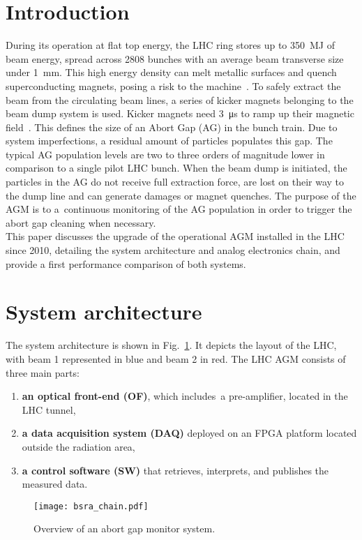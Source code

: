 \section{Introduction}
During its operation at flat top energy, the LHC ring stores up to \SI{350}{MJ} of beam energy, spread across 2808 bunches with an average beam transverse size under \SI{1}{mm}.
%
This high energy density can melt metallic surfaces and quench
superconducting magnets, posing a risk to the machine~\cite{LHC_report}.
%
To safely extract the beam from the circulating beam lines, a series of kicker magnets belonging to the beam dump system is used. 
%
Kicker magnets need \SI{3}{\micro\second} to ramp up their magnetic field~\cite{beam_dump_system}.
%
This defines the size of an Abort Gap (AG) in the bunch train.
%
Due to system imperfections, a residual amount of particles populates this gap.
%
The typical AG population levels are two to three orders of magnitude lower in comparison to a single pilot LHC bunch.
%
When the beam dump is initiated, the particles in the AG do not receive full
extraction force, are lost on their way to the dump line and can generate damages or magnet quenches.  
%
%
The purpose of the AGM \cite{particles_in_ag} is to 
a~continuous monitoring of the AG population in order to trigger the abort gap cleaning when  necessary. 
\\
This paper discusses the upgrade of the operational AGM installed in the LHC since 2010, detailing the system architecture and analog electronics chain, and provide a first performance comparison  of both systems.

\section{System architecture}
The system architecture is shown in Fig.~\ref{fig:bsra_chain}.
%
It depicts the layout of the LHC, with beam 1 represented in blue and beam 2 in red.
%
The LHC AGM consists of three main parts:
%
\begin{enumerate}
    \item \textbf{an optical front-end (OF)}, which includes~a pre-amplifier, located in the LHC tunnel,
    \item \textbf{a data acquisition system (DAQ)} deployed on an FPGA platform located outside the radiation area,
    \item \textbf{a control software (SW)} that retrieves, interprets, and publishes the measured data.
\end{enumerate}
%
\begin{figure}[!tbh]
    \centering
    \texttt{[image: bsra\_chain.pdf]}
    \caption{Overview of an abort gap monitor system.}
    \label{fig:bsra_chain}
\end{figure} 

